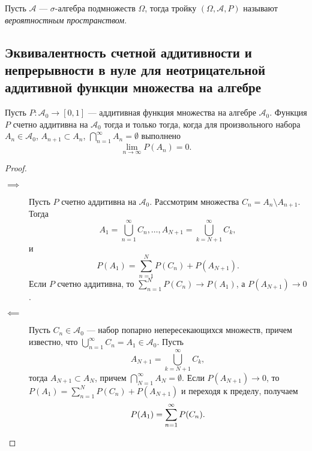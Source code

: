 \begin{definition}
    Пусть $\mathcal{A}$ --- $\sigma$-алгебра подмножеств $\Omega$, тогда тройку $(\Omega, \mathcal{A}, P)$ называют {\it вероятностным пространством}.
\end{definition}

\sectionbreak
\subsection{Эквивалентность счетной аддитивности и непрерывности в нуле для неотрицательной аддитивной функции множества на алгебре}

\begin{proposal*}
    Пусть $P \colon \mathcal{A}_0 \to [0, 1]$ --- аддитивная функция множества на алгебре $\mathcal{A}_0$.
    Функция $P$ счетно аддитивна на $\mathcal{A}_0$ тогда и только тогда, когда для произвольного набора $A_n \in \mathcal{A}_{0}$, $A_{n + 1}\subset A_n$, $\bigcap\limits_{n = 1}^\infty A_n = \emptyset$ выполнено
    \[
        \lim\limits_{n \to \infty}P(A_n) = 0.
    \]
\end{proposal*}

\begin{proof}~
    \begin{description}
        \item[$\implies$] Пусть $P$ счетно аддитивна на $\mathcal{A}_0$.
        Рассмотрим множества $C_n = A_n \setminus A_{n + 1}$.
        Тогда
        \[
            A_1 = \bigcup\limits_{n = 1}^\infty C_n, \ldots, A_{N + 1} = \bigcup\limits_{k = N + 1}^{\infty} C_k,
        \]
        и
        \[
            P(A_1) = \sum\limits_{n = 1}^N P(C_n) + P(A_{N + 1}).
        \]
        Если $P$ счетно аддитивна, то $\sum\limits_{n = 1}^N P(C_n) \to P(A_1)$, а $P(A_{N + 1}) \to 0$.
        \item[$\impliedby$] Пусть $C_n \in \mathcal{A}_0$ --- набор попарно непересекающихся множеств, причем известно, что $\bigcup\limits_{n = 1}^\infty C_n = A_1 \in \mathcal{A}_0$.
        Пусть
        \[
            A_{N + 1} = \bigcup\limits_{k = N + 1}^{\infty} C_k,
        \]
        тогда $A_{N + 1} \subset A_N$, причем $\bigcap\limits_{N = 1}^\infty A_N = \emptyset$.
        Если $P(A_{N+1})\to 0$, то $P(A_1)=\sum\limits_{n=1}^N P(C_n) + P(A_{N+1})$ и переходя к пределу, получаем
        \[
            P(A_1) = \sum\limits_{n = 1}^\infty P(C_n). \qedhere
        \]
    \end{description}
\end{proof}

